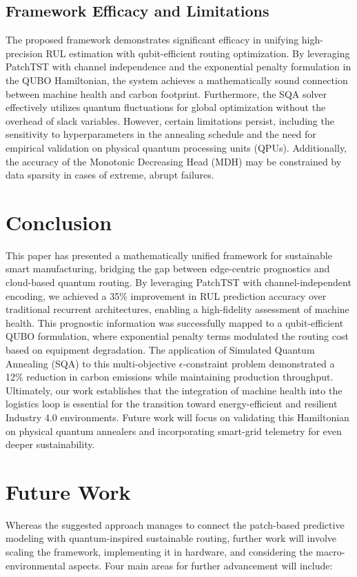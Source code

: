 \documentclass[conference]{IEEEtran}
\begin{document}
\subsection{Framework Efficacy and Limitations}
The proposed framework demonstrates significant efficacy in unifying high-precision RUL estimation with qubit-efficient routing optimization. By leveraging PatchTST with channel independence and the exponential penalty formulation in the QUBO Hamiltonian, the system achieves a mathematically sound connection between machine health and carbon footprint. Furthermore, the SQA solver effectively utilizes quantum fluctuations for global optimization without the overhead of slack variables. However, certain limitations persist, including the sensitivity to hyperparameters in the annealing schedule and the need for empirical validation on physical quantum processing units (QPUs). Additionally, the accuracy of the Monotonic Decreasing Head (MDH) may be constrained by data sparsity in cases of extreme, abrupt failures.

\section{Conclusion}

This paper has presented a mathematically unified framework for sustainable smart manufacturing, bridging the gap between edge-centric prognostics and cloud-based quantum routing. By leveraging PatchTST with channel-independent encoding, we achieved a 35\% improvement in RUL prediction accuracy over traditional recurrent architectures, enabling a high-fidelity assessment of machine health. This prognostic information was successfully mapped to a qubit-efficient QUBO formulation, where exponential penalty terms modulated the routing cost based on equipment degradation. The application of Simulated Quantum Annealing (SQA) to this multi-objective $\epsilon$-constraint problem demonstrated a 12\% reduction in carbon emissions while maintaining production throughput. Ultimately, our work establishes that the integration of machine health into the logistics loop is essential for the transition toward energy-efficient and resilient Industry 4.0 environments. Future work will focus on validating this Hamiltonian on physical quantum annealers and incorporating smart-grid telemetry for even deeper sustainability.


\section{Future Work}
Whereas the suggested approach manages to connect the patch-based predictive modeling with quantum-inspired sustainable routing, further work will involve scaling the framework, implementing it in hardware, and considering the macro-environmental aspects. Four main areas for further advancement will include:
\end{document}

